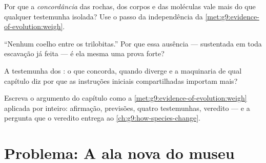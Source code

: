 \begin{exercise}[$\star\star$]\label{exo:g9:evidence-of-evolution:9}
Por que a \emph{concordância} das rochas, dos corpos e das
moléculas vale mais do que qualquer testemunha isolada? Use o
passo da independência da
\cref{met:g9:evidence-of-evolution:weigh}.
\end{exercise}

\begin{exercise}[$\star\star$]\label{exo:g9:evidence-of-evolution:10}
``Nenhum coelho entre os trilobitas.'' Por que essa ausência
--- sustentada em toda escavação já feita --- é ela mesma uma
prova forte?
\end{exercise}

\begin{exercise}[$\star\star$]\label{exo:g9:evidence-of-evolution:11}
A testemunha dos : o que concorda, quando diverge e a
maquinaria de qual capítulo diz por que as instruções
iniciais compartilhadas importam mais?
\end{exercise}

\begin{exercise}[$\star\star\star$]\label{exo:g9:evidence-of-evolution:12}
Escreva o argumento do capítulo como a
\cref{met:g9:evidence-of-evolution:weigh} aplicada por
inteiro: afirmação, previsões, quatro testemunhas, veredito
--- e a pergunta que o veredito entrega ao
\cref{ch:g9:how-species-change}.
\end{exercise}

\section{Problema: A ala nova do museu}


